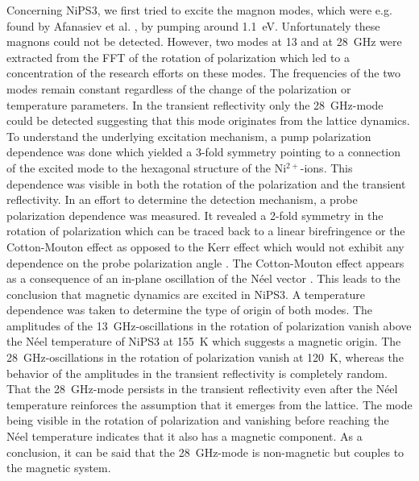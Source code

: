 Concerning NiPS3, we first tried to excite the magnon modes, which were e.g. found by Afanasiev et al. \cite{afanasiev_controlling_2021}, by pumping around \qty{1.1}{eV}.
Unfortunately these magnons could not be detected.
However, two modes at 13 and at \qty{28}{GHz} were extracted from the FFT of the rotation of polarization which led to a concentration of the research efforts on these modes.
The frequencies of the two modes remain constant regardless of the change of the polarization or temperature parameters.
In the transient reflectivity only the \qty{28}{GHz}-mode could be detected suggesting that this mode originates from the lattice dynamics.
To understand the underlying excitation mechanism, a pump polarization dependence was done which yielded a 3-fold symmetry pointing to a connection of the excited mode to the hexagonal structure of the Ni$^{2+}$-ions.
This dependence was visible in both the rotation of the polarization and the transient reflectivity.
In an effort to determine the detection mechanism, a probe polarization dependence was measured.
It revealed a 2-fold symmetry in the rotation of polarization which can be traced back to a linear birefringence or the Cotton-Mouton effect as opposed to the Kerr effect which would not exhibit any dependence on the probe polarization angle \cite{toyoda_phase_2023}.
The Cotton-Mouton effect appears as a consequence of an in-plane oscillation of the Néel vector \cite{nemec_antiferromagnetic_2018}.
This leads to the conclusion that magnetic dynamics are excited in NiPS3.
A temperature dependence was taken to determine the type of origin of both modes.
The amplitudes of the \qty{13}{GHz}-oscillations in the rotation of polarization vanish above the Néel temperature of NiPS3 at \qty{155}{K} which suggests a magnetic origin.
The \qty{28}{GHz}-oscillations in the rotation of polarization vanish at \qty{120}{K}, whereas the behavior of the amplitudes in the transient reflectivity is completely random.
That the \qty{28}{GHz}-mode persists in the transient reflectivity even after the Néel temperature reinforces the assumption that it emerges from the lattice.
The mode being visible in the rotation of polarization and vanishing before reaching the Néel temperature indicates that it also has a magnetic component.
As a conclusion, it can be said that the \qty{28}{GHz}-mode is non-magnetic but couples to the magnetic system.

